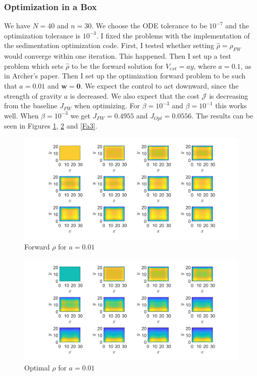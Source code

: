 \documentclass[11pt, a4paper]{article}
\theoremstyle{definition}
\newcommand{\w}{\mathbf{w}}
\newcommand{\hr}{\widehat \rho}
\begin{document}
\subsubsection{Optimization in a Box}
We have $N = 40$ and $n = 30$. We choose the ODE tolerance to be $10^{-7}$ and the optimization tolerance is $10^{-3}$.
I fixed the problems with the implementation of the sedimentation optimization code. First, I tested whether setting $\hr = \rho_{FW}$ would converge within one iteration. This happened. 
Then I set up a test problem which sets $\hr$ to be the forward solution for $V_{ext} = ay$, where $a = 0.1$, as in Archer's paper. Then I set up the optimization forward problem to be such that $a = 0.01$ and $\w = \mathbf 0$. We expect the control to act downward, since the strength of gravity $a$ is decreased.
We also expect that the cost $\mathcal J$ is decreasing from the baseline $J_{FW}$ when optimizing.
For $\beta = 10^{-3}$ and $\beta = 10^{-1}$ this works well.
When $\beta = 10^{-3}$ we get $J_{FW} = 0.4955$ and $J_{Opt} = 0.0556 $. 
The results can be seen in Figures \ref{Fa1}, \ref{Fa2} and \ref{Fa3}.
\begin{figure}[h]
	\centering
	\includegraphics[scale=0.35]{F11.png}
	\caption{Forward $\rho$ for $a = 0.01$} 
	\label{Fa1}
\end{figure}	
\begin{figure}[h]
	\centering
	\includegraphics[scale=0.35]{F21.png}
	\caption{Optimal $\rho$ for $a = 0.01$} 
	\label{Fa2}
\end{figure}
\end{document}
